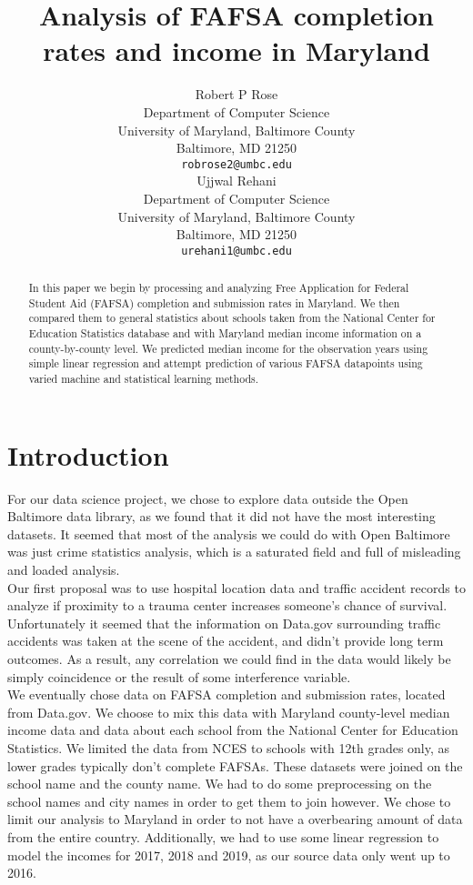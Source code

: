 \documentclass[12pt]{article}
\title{Analysis of FAFSA completion rates and income in Maryland}
\author{
  Robert P Rose \\
  Department of Computer Science\\
  University of Maryland, Baltimore County\\
  Baltimore, MD 21250 \\
  \texttt{robrose2@umbc.edu} \\
   \And
  Ujjwal Rehani \\
  Department of Computer Science\\
  University of Maryland, Baltimore County\\
  Baltimore, MD 21250 \\
  \texttt{urehani1@umbc.edu} \\
}
\begin{document}
\maketitle

\begin{abstract}
In this paper we begin by processing and analyzing Free Application for Federal
Student Aid (FAFSA) completion and submission rates in Maryland. We then compared them to 
general statistics about schools taken from the National Center for Education 
Statistics database and with Maryland median income information on a 
county-by-county level. We predicted median income for the observation years using 
simple linear regression and attempt prediction of various FAFSA datapoints using 
varied machine and statistical learning methods. \\
\end{abstract}

\section{Introduction}
For our data science project, we chose to explore data outside the Open Baltimore
data library, as we found that it did not have the most interesting datasets. It
seemed that most of the analysis we could do with Open Baltimore was just crime
statistics analysis, which is a saturated field and full of misleading and 
loaded analysis.\cite{weatherburn2011} \\

Our first proposal was to use hospital location data and traffic accident records
to analyze if proximity to a trauma center increases someone's chance of survival.
Unfortunately it seemed that the information on Data.gov surrounding traffic
accidents was taken at the scene of the accident, and didn't provide long term
outcomes. As a result, any correlation we could find in the data would likely be
simply coincidence or the result of some interference variable. \\

We eventually chose data on FAFSA completion and submission rates, located from
Data.gov.\cite{fafsa2019} We choose to mix this data with Maryland county-level
median income  data and data about each school from the National Center for 
Education Statistics.\cite{nces2019} We limited the data from NCES to schools with
12th grades only, as lower grades typically don't complete FAFSAs. These datasets 
were joined on the school name and the county name. We had to do some 
preprocessing on the school names and city names in order to get them to join 
however. We chose to limit our analysis to Maryland in order to not have a 
overbearing amount of data from the entire country. Additionally, we had to use 
some linear regression to model the incomes for 2017, 2018 and 2019, as our source 
data only went up to 2016.\\
\end{document}
